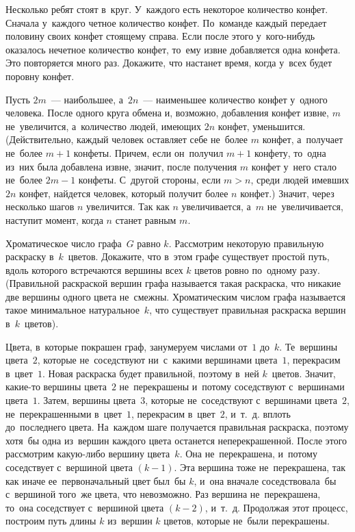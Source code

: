 \begin{problems}

\item
Несколько ребят стоят в~круг.
У~каждого есть некоторое количество конфет.
Сначала у~каждого четное количество конфет.
По~команде каждый передает половину своих конфет стоящему справа.
Если после этого у~кого-нибудь оказалось нечетное количество конфет, то~ему
извне добавляется одна конфета.
Это повторяется много раз.
Докажите, что настанет время, когда у~всех будет поровну конфет.

\end{problems}

\ifincludesolutions
Пусть $2 m$~--- наибольшее, а~$2 n$~--- наименьшее количество
конфет у~одного человека.
После одного круга обмена и, возможно, добавления конфет извне, $m$
не~увеличится, а~количество людей, имеющих $2 n$ конфет, уменьшится.
(Действительно, каждый человек оставляет себе не~более $m$ конфет, а~получает
не~более $m + 1$ конфеты.
Причем, если он~получил $m + 1$ конфету, то~одна из~них была добавлена извне,
значит, после получения $m$ конфет у~него стало не~более $2 m - 1$ конфеты.
С~другой стороны, если $m > n$, среди людей имевших $2 n$ конфет, найдется
человек, который получит более $n$ конфет.)
Значит, через несколько шагов $n$ увеличится.
Так как $n$ увеличивается, а~$m$ не~увеличивается, наступит момент, когда $n$
станет равным $m$.
\fi %

\begin{problems}

\item
Хроматическое число графа~$G$ равно $k$.
Рассмотрим некоторую правильную раскраску в~$k$~цветов.
Докажите, что в~этом графе существует простой путь, вдоль которого встречаются
вершины всех $k$ цветов ровно по~одному разу.
(Правильной раскраской вершин графа называется такая раскраска, что никакие две
вершины одного цвета не~смежны.
Хроматическим числом графа называется такое минимальное натуральное~$k$, что
существует правильная раскраска вершин в~$k$~цветов).

\end{problems}

\ifincludesolutions
Цвета, в~которые покрашен граф, занумеруем числами от~$1$ до~$k$.
Те~вершины цвета~$2$, которые не~соседствуют ни~с~какими вершинами цвета~$1$,
перекрасим в~цвет~$1$.
Новая раскраска будет правильной, поэтому в~ней $k$~цветов.
Значит, какие-то вершины цвета~$2$ не~перекрашены и~потому соседствуют
с~вершинами цвета~$1$.
Затем, вершины цвета~$3$, которые не~соседствуют с~вершинами цвета~$2$,
не~перекрашенными в~цвет~$1$, перекрасим в~цвет~$2$, и~т.~д. вплоть
до~последнего цвета.
На~каждом шаге получается правильная раскраска, поэтому хотя~бы одна из~вершин
каждого цвета останется неперекрашенной.
После этого рассмотрим какую-либо вершину цвета~$k$.
Она не~перекрашена, и~потому соседствует с~вершиной цвета $(k - 1)$.
Эта вершина тоже не~перекрашена, так как иначе ее~первоначальный цвет был~бы
$k$, и~она вначале соседствовала~бы с~вершиной того~же цвета, что невозможно.
Раз вершина не~перекрашена, то~она соседствует с~вершиной цвета $(k - 2)$,
и~т.~д. Продолжая этот процесс, построим путь длины $k$ из~вершин $k$ цветов,
которые не~были перекрашены.
\fi %

